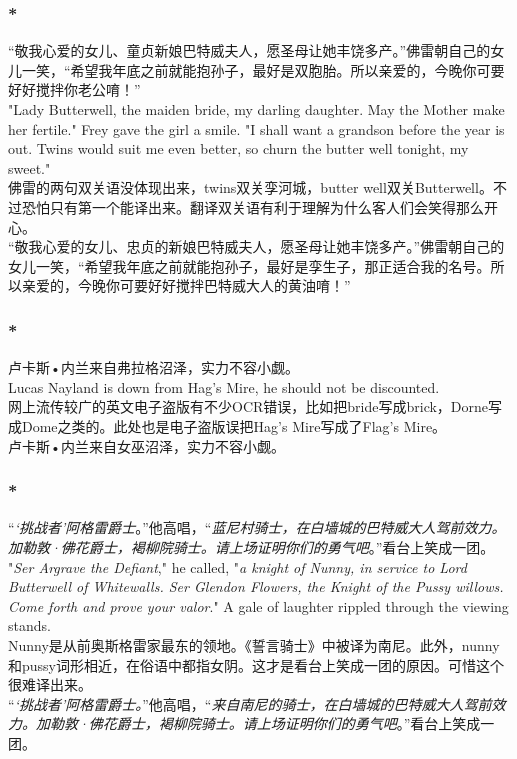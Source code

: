 \documentclass[12pt,a4paper]{article}
\newcommand{\h}[1]{{\color{red}#1}\\}
\newcommand{\la}[1]{{\color{blue}#1}\\}
\begin{document}
\subsubsection{\color{red}*}\la{
	“敬我心爱的女儿、童贞新娘巴特威夫人，愿圣母让她丰饶多产。”佛雷朝自己的女儿一笑，“希望我年底之前就能抱孙子，最好是双胞胎。所以亲爱的，今晚你可要好好搅拌你老公唷！” \\
	"Lady Butterwell, the maiden bride, my darling daughter. May the Mother make her fertile." Frey gave the girl a smile. "I shall want a grandson before the year is out. Twins would suit me even better, so churn the butter well tonight, my sweet."}\h{
	佛雷的两句双关语没体现出来，twins双关孪河城，butter well双关Butterwell。不过恐怕只有第一个能译出来。翻译双关语有利于理解为什么客人们会笑得那么开心。}
	“敬我心爱的女儿、忠贞的新娘巴特威夫人，愿圣母让她丰饶多产。”佛雷朝自己的女儿一笑，“希望我年底之前就能抱孙子，最好是孪生子，那正适合我的名号。所以亲爱的，今晚你可要好好搅拌巴特威大人的黄油唷！” 
	
\subsubsection{\color{red}*}\la{
	 卢卡斯•内兰来自弗拉格沼泽，实力不容小觑。\\
	 Lucas Nayland is down from Hag's Mire, he should not be discounted.}\h{
	 网上流传较广的英文电子盗版有不少OCR错误，比如把bride写成brick，Dorne写成Dome之类的。此处也是电子盗版误把Hag's Mire写成了Flag's Mire。}
	 卢卡斯•内兰来自女巫沼泽，实力不容小觑。
	 
\subsubsection{\color{red}*}\la{
	“\emph{‘挑战者’阿格雷爵士}。”他高唱，“\emph{蓝尼村骑士，在白墙城的巴特威大人驾前效力。加勒敦·佛花爵士，褐柳院骑士。请上场证明你们的勇气吧}。”看台上笑成一团。\\
	"\emph{Ser Argrave the Defiant}," he called, "\emph{a knight of Nunny, in service to Lord Butterwell of Whitewalls. Ser Glendon Flowers, the Knight of the Pussy willows. Come forth and prove your valor}." A gale of laughter rippled through the viewing stands.}\h{
	Nunny是从前奥斯格雷家最东的领地。《誓言骑士》中被译为南尼。此外，nunny和pussy词形相近，在俗语中都指女阴。这才是看台上笑成一团的原因。可惜这个很难译出来。}
	“\emph{‘挑战者’阿格雷爵士。}”他高唱，“\emph{来自南尼的骑士，在白墙城的巴特威大人驾前效力。加勒敦·佛花爵士，褐柳院骑士。请上场证明你们的勇气吧}。”看台上笑成一团。
\end{document}
